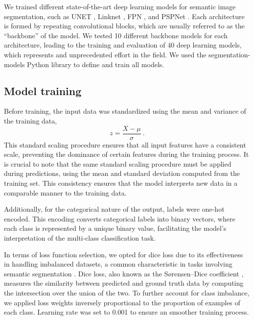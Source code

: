 We trained different state-of-the-art deep learning models for semantic image
segmentation, such as UNET \cite{Ronneberger2015}, Linknet
\cite{Chaurasia2017}, FPN \cite{Lin2017} , and PSPNet \cite{Zhao2017}. Each
architecture is formed by repeating convolutional blocks, which are usually
referred to as the ``backbone'' of the model. We tested 10 different backbone
models for each architecture, leading to the training and evaluation of 40 deep
learning models, which represents and unprecedented effort in the field. We
used the segmentation-models Python library \cite{segmentation_models} to
define and train
all models.

\subsection{Model training}

Before training, the input data was standardized using the mean and variance of
the training data,
\begin{equation}
    z=\frac{X-\mu}{\sigma} \ .
\end{equation}
This standard scaling procedure ensures that all input features have a
consistent scale, preventing the dominance of certain features during the
training process. It is crucial to note that the same standard scaling
procedure must be applied during predictions, using the mean and standard
deviation computed from the training set. This consistency ensures that the
model interprets new data in a comparable manner to the training data.

Additionally, for the categorical nature of the output, labels were one-hot
encoded. This encoding converts categorical labels into binary vectors, where
each class is represented by a unique binary value, facilitating the model's
interpretation of the multi-class classification task.

In terms of loss function selection, we opted for dice loss due to its
effectiveness in handling imbalanced datasets, a common characteristic in tasks
involving semantic segmentation \cite{rahman2016optimizing}. Dice loss, also
known as the Sørensen–Dice coefficient \cite{sorensen1948method,
    dice1945measures}, measures the similarity between predicted and ground
truth
data by computing the intersection over the union of the two. To further
account for class imbalance, we applied loss weights inversely proportional to
the proportion of examples of each class. Learning rate was set to 0.001 to
ensure an smoother training process.

